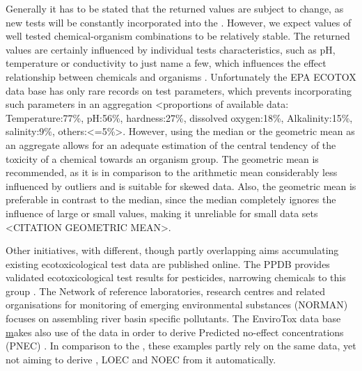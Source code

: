 Generally it has to be stated that the returned values are subject to change, as new tests will be constantly incorporated into the \etoxbase{}. However, we expect values of well tested chemical-organism combinations to be relatively stable. The returned values are certainly influenced by individual tests characteristics, such as pH, temperature or conductivity to just name a few, which influences the effect relationship between chemicals and organisms \citep{rosenkrantz_influence_2013,li_temperature_2011}. Unfortunately the EPA ECOTOX data base has only rare records on test parameters, which prevents incorporating such parameters in an aggregation <proportions of available data: Temperature:77\%, pH:56\%, hardness:27\%, dissolved oxygen:18\%, Alkalinity:15\%, salinity:9\%, others:<=5\%>. However, using the median or the geometric mean as an aggregate allows for an adequate estimation of the central tendency of the toxicity of a chemical towards an organism group. The geometric mean is recommended, as it is in comparison to the arithmetic mean considerably less influenced by outliers and is suitable for skewed data. Also, the geometric mean is preferable in contrast to the median, since the median completely ignores the influence of large or small values, making it unreliable for small data sets <CITATION GEOMETRIC MEAN>.

Other initiatives, with different, though partly overlapping aims accumulating existing ecotoxicological test data are published online. The PPDB provides validated ecotoxicological test results for pesticides, narrowing chemicals to this group \citep{lewis_international_2016}. The Network of reference laboratories, research centres and related organisations for monitoring of emerging environmental substances (NORMAN) focuses on assembling river basin specific pollutants\citep{von_der_ohe_new_2011}. The EnviroTox data base \href{https://envirotoxdatabase.org/} makes also use of the \epa{} data in order to derive Predicted no-effect concentrations (PNEC) \citep{health_and_environmental_sciences_institute_hesi_envirotox_2019}. In comparison to the \etoxbase, these examples partly rely on the same data, yet not aiming to derive \ecfifty, LOEC and NOEC from it automatically.


\pagebreak